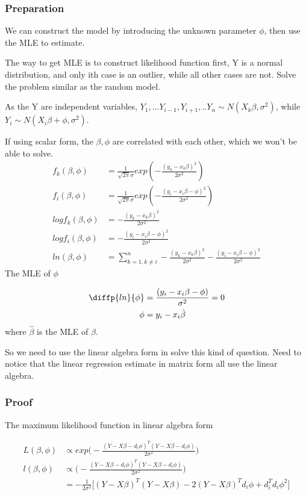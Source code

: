 \subsubsection{Preparation}
We can construct the model by introducing the unknown parameter $\phi$, then use the MLE to estimate.

The way to get MLE is to construct likelihood function first, Y is a normal distribution, and only ith case is an outlier, while all other cases are not. Solve the problem similar as the random model.

As the Y are independent variables, $Y_1, ... Y_{i-1}, Y_{i+1}, ..Y_{n} \sim N(X_k \beta, \sigma^2)$, while 
$Y_{i} \sim N(X_i \beta + \phi, \sigma^2)$.

If using scalar form, the $\beta , \phi$ are correlated with each other, which we won't be able to solve. 
\begin{align*}
	f_k(\beta, \phi) &= \frac{1}{\sqrt{2\pi} \sigma} exp(-\frac{(y_k - x_k \beta)^2}{2 \sigma^2}) \\
	f_i(\beta, \phi) &= \frac{1}{\sqrt{2\pi} \sigma} exp(-\frac{(y_i - x_i \beta - \phi)^2}{2 \sigma^2}) \\
	log f_k(\beta, \phi)  &= -\frac{(y_k - x_k \beta)^2}{2 \sigma^2} \\
	log f_i(\beta, \phi)  &= -\frac{(y_i - x_i \beta - \phi)^2}{2 \sigma^2} \\
	ln (\beta, \phi) &= \sum_{k=1, k \neq i} ^{n} -\frac{(y_k - x_k \beta)^2}{2 \sigma^2} -\frac{(y_i - x_i \beta - \phi)^2}{2 \sigma^2} 
\end{align*}
The MLE of $\phi$

\begin{align*}
	\diffp{ln}{\phi}  &=\frac{(y_i - x_i \beta - \phi)}{\sigma^2} = 0\\
	\phi &= y_i - x_i \hat{\beta}\\
\end{align*}
where $\hat{\beta}$ is the MLE of $\beta$. 

So we need to use the linear algebra form in solve this kind of question. Need to notice that the linear regression estimate in matrix form all use the linear algebra. 

\subsubsection{Proof}
The maximum likelihood function in linear algebra form

\begin{align*}
	L (\beta, \phi) & \propto exp \Bigg( -\frac{(Y- X\beta -d_i \phi)^T (Y- X\beta -d_i \phi)}{2 \sigma^2}  \Bigg) \\
	l (\beta, \phi) & \propto \Bigg( -\frac{(Y- X\beta -d_i \phi)^T (Y- X\beta -d_i \phi)}{2 \sigma^2}  \Bigg) \\
	&= -\frac{1}{2\sigma^2} \Big[(Y-X\beta)^T (Y-X\beta) -2 (Y-X\beta)^T d_i \phi + d_i^T d_i \phi^2 \Big]
\end{align*}

